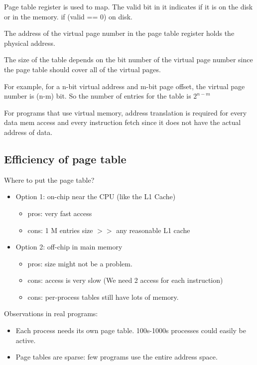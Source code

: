 \documentclass[letterpaper,12pt]{article}
\begin{document}
Page table register is used to map. The valid bit in it indicates if it is on the disk or in the memory. if (valid == 0) on disk.

The address of the virtual page number in the page table register holds the physical address.

The size of the table depends on the bit number of the virtual page number since the page table should cover all of the virtual pages.

For example, for a n-bit virtual address and m-bit page offset, the virtual page number is (n-m) bit. So the number of entries for the table is $2^{n-m}$

For programs that use virtual memory, address translation is required for every data mem access and every instruction fetch since it does not have the actual address of data.

\subsection{Efficiency of page table}

Where to put the page table?
\begin{itemize}
    \item Option 1: on-chip near the CPU (like the L1 Cache)
          \begin{itemize}
              \item pros: very fast access
              \item cons: 1 M entries size $>>$ any reasonable L1 cache
          \end{itemize}
    \item Option 2: off-chip in main memory
          \begin{itemize}
              \item pros: size might not be a problem.
              \item cons: access is very slow (We need 2 access for each instruction)
              \item cons: per-process tables still have lots of memory.
          \end{itemize}
\end{itemize}

Observations in real programs:
\begin{itemize}
    \item Each process needs its own page table. 100s-1000s processes could easily be active.
    \item Page tables are sparse: few programs use the entire address space.
\end{itemize}
\end{document}
